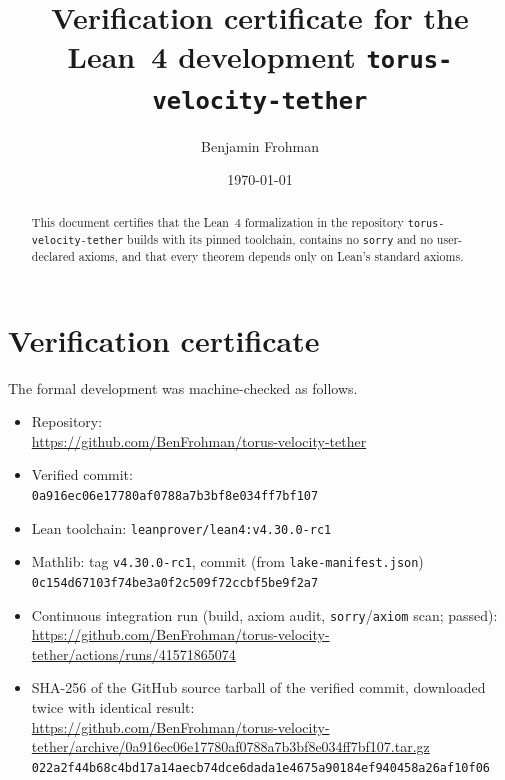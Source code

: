 \documentclass[11pt]{amsart}
\title{Verification certificate for the Lean~4 development \texttt{torus-velocity-tether}}
\author{Benjamin Frohman}
\date{\today}
\begin{document}
\begin{abstract}
This document certifies that the Lean~4 formalization in the repository \texttt{torus-velocity-tether} builds with its pinned toolchain, contains no \texttt{sorry} and no user-declared axioms, and that every theorem depends only on Lean's standard axioms.
\end{abstract}
\maketitle
{}\par

\section{Verification certificate}

The formal development was machine-checked as follows.

{\raggedright
\begin{itemize}
\item Repository:\\ {\footnotesize\url{https://github.com/BenFrohman/torus-velocity-tether}}
\item Verified commit:\\ {\footnotesize\texttt{0a916ec06e17780af0788a7b3bf8e034ff7bf107}}
\item Lean toolchain: \texttt{leanprover/lean4:v4.30.0-rc1}
\item Mathlib: tag \texttt{v4.30.0-rc1}, commit (from \texttt{lake-manifest.json})\\ {\footnotesize\texttt{0c154d67103f74be3a0f2c509f72ccbf5be9f2a7}}
\item Continuous integration run (build, axiom audit, \texttt{sorry}/\texttt{axiom} scan; passed):\\ {\footnotesize\url{https://github.com/BenFrohman/torus-velocity-tether/actions/runs/41571865074}}
\item SHA-256 of the GitHub source tarball of the verified commit, downloaded twice with identical result:\\ {\footnotesize\url{https://github.com/BenFrohman/torus-velocity-tether/archive/0a916ec06e17780af0788a7b3bf8e034ff7bf107.tar.gz}}\\
{\footnotesize\texttt{022a2f44b68c4bd17a14aecb74dce6dada1e4675a90184ef940458a26af10f06}}
\end{itemize}\par}
\end{document}
